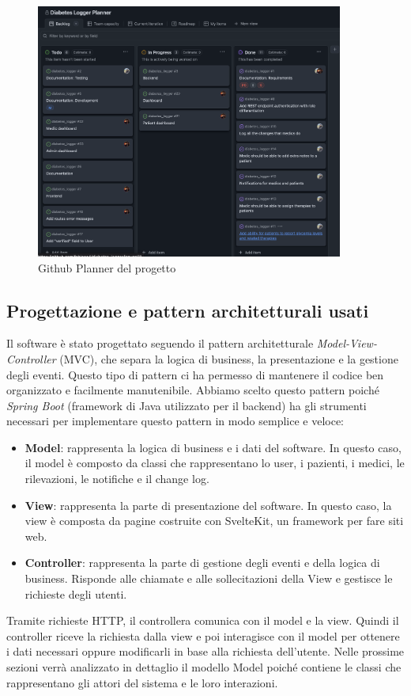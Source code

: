 \documentclass[a4paper]{article}
\begin{document}
\begin{figure}[H]
  \begin{center}
    \includegraphics[width=0.9\textwidth]{githubPlanner.png}
  \end{center}
  \caption{Github Planner del progetto} 
  \label{fig:githubPlanner}
\end{figure}

\subsection{Progettazione e pattern architetturali usati}

Il software è stato progettato seguendo il pattern architetturale \textit{Model-View-Controller} 
(MVC), che separa la logica di business, la presentazione e la gestione degli eventi.
Questo tipo di pattern ci ha permesso di mantenere il codice ben organizzato e facilmente manutenibile.
Abbiamo scelto questo pattern poiché \textit{Spring Boot} (framework di Java utilizzato per il backend) ha gli strumenti necessari
per implementare questo pattern in modo semplice e veloce:
\begin{itemize}
  \item \textbf{Model}: rappresenta la logica di business e i dati del software. 
  In questo caso, il model è composto da classi che rappresentano lo user, i pazienti, i medici, 
  le rilevazioni, le notifiche e il change log. 
  \item \textbf{View}: rappresenta la parte di presentazione del software. In questo caso, 
  la view è composta da pagine costruite con SvelteKit, un framework per fare siti web. 
  \item \textbf{Controller}: rappresenta la parte di gestione degli eventi e della logica di business. 
  Risponde alle chiamate e alle sollecitazioni della View e gestisce le richieste degli utenti.
\end{itemize}
Tramite richieste HTTP, il controllera comunica con il model e la view. 
Quindi il controller riceve la richiesta dalla view e poi interagisce con il model per 
ottenere i dati necessari oppure modificarli in base alla richiesta dell'utente.
Nelle prossime sezioni verrà analizzato in dettaglio il modello Model poiché contiene 
le classi che rappresentano gli attori del sistema e le loro interazioni.
\end{document}
